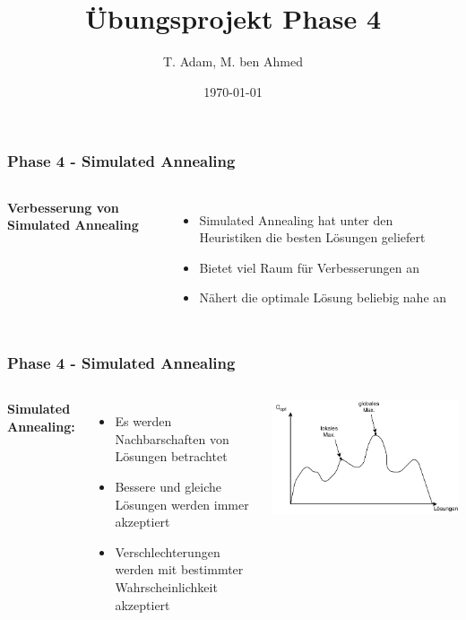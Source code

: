 \documentclass[aspectratio=169]{beamer}
\title[Übungsprojekt Phase 4]{Übungsprojekt Phase 4} %
\author{T. Adam, M. ben Ahmed} %
\institute[UOS] %
{

Universität Osnabrück \\ %

\medskip
\textit{Æ} %


}
\date{\today} %
\begin{document}
\begin{frame}
\titlepage %
\end{frame}




\begin{frame}
\frametitle{Phase 4 - Simulated Annealing}
\begin{columns}[c] %
	
	\textbf{Verbesserung von Simulated Annealing}
	\begin{itemize}
		\item Simulated Annealing hat unter den Heuristiken die besten Lösungen geliefert
		\item Bietet viel Raum für Verbesserungen an
		\item Nähert die optimale Lösung beliebig nahe an
	\end{itemize}
\end{columns}
\end{frame}

\begin{frame}
\frametitle{Phase 4 - Simulated Annealing}
\begin{columns}[c] %
	\textbf{Simulated Annealing:}
	\begin{itemize}
		\item Es werden Nachbarschaften von Lösungen  betrachtet
		\item Bessere und gleiche Lösungen werden immer akzeptiert
		\item Verschlechterungen werden mit bestimmter Wahrscheinlichkeit akzeptiert
	\end{itemize}
	\includegraphics[scale=.6]{sa_maximum.pdf}	
\end{columns}
\end{frame}
\end{document}
